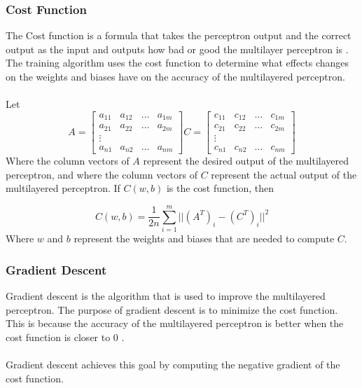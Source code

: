 \subsubsection{Cost Function}
The Cost function is a formula that takes the perceptron output and the correct output as the input and outputs how bad or good the multilayer perceptron is \cite{book}. The training algorithm uses the cost function to determine what effects changes on the weights and biases have on the accuracy of the multilayered perceptron.\\ \\

Let 
$$
	A = \begin{bmatrix}
		a_{11} & a_{12} & \dots & a_{1m} \\
		a_{21} & a_{22} & \dots & a_{2m} \\
		\vdots \\
		a_{n1} & a_{n2} & \dots & a_{nm}
	\end{bmatrix}
	C = \begin{bmatrix}
		c_{11} & c_{12} & \dots & c_{1m} \\
		c_{21} & c_{22} & \dots & c_{2m} \\
		\vdots \\
		c_{n1} & c_{n2} & \dots & c_{nm}
	\end{bmatrix}
$$
Where the column vectors of $A$ represent the desired output of the multilayered perceptron, and where the column vectors of $C$ represent the actual output of the multilayered perceptron. If $C(w, b)$ is the cost function, then

$$
	C(w, b) = \frac{1}{2n} \sum_{i=1}^{m} ||(A^T)_i-(C^T)_i||^2
$$
Where $w$ and $b$ represent the weights and biases that are needed to compute $C$.

\subsubsection{Gradient Descent}

Gradient descent is the algorithm that is used to improve the multilayered perceptron. The purpose of gradient descent is to minimize the cost function. This is because the accuracy of the multilayered perceptron is better when the cost function is closer to 0 \cite{book}. \\ \\
Gradient descent achieves this goal by computing the negative gradient of the cost function.

